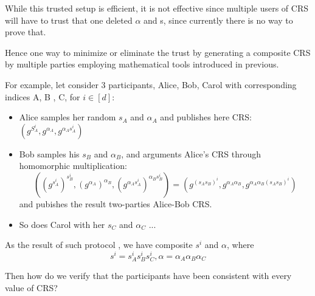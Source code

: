 \documentclass[a4paper,11pt]{article}
\begin{document}
While this trusted setup is efficient, it is not effective since multiple users of CRS will have to trust that one deleted $\alpha$ and s, since currently there is no way to prove that.

Hence one way to minimize or eliminate the trust by generating a composite CRS by multiple parties employing mathematical tools introduced in previous.

For example, let consider 3 participants, Alice, Bob, Carol with corresponding indices A, B , C, for $i \in [d]$:

\begin{itemize}
\item Alice samples her random $s_A$ and $\alpha_A$ and publishes here CRS:  $(g^{S_A^i}, g^{\alpha_A}, g^{\alpha_A s_A^i})$
\item Bob samples his $s_B$ and $\alpha_B$, and arguments Alice's CRS through homomorphic multiplication:
\begin{displaymath}
((g^{s_A^i})^{s_B^i}, (g^{\alpha_A})^{\alpha_B}, (g^{\alpha_A s_A^i})^{\alpha_B s_B^i} )  = (g^{(s_A s_B)^i}, g^{\alpha_A \alpha_B}, g^{\alpha_A \alpha_B (s_A s_B)^i})
\end{displaymath}
and pubishes the result two-parties Alice-Bob CRS. 
\item So does Carol with her $s_C$ and $\alpha_C$ ...
\end{itemize}

As the result of such protocol , we have composite $s^i$ and $\alpha$, where 
\begin{equation}
s^i = s_A^i s_B^i s_C^i,  \alpha = \alpha_A \alpha_B \alpha_C
\end{equation}

Then how do we verify that the participants have been consistent with every value of CRS? 



\end{document}
